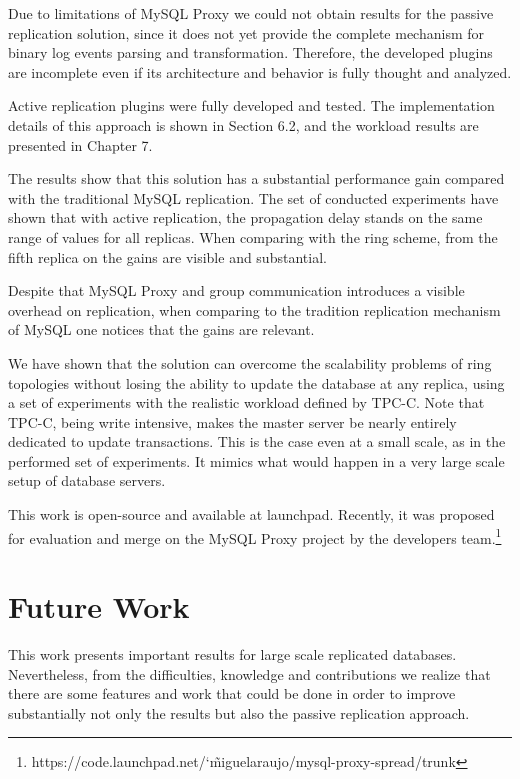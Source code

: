 Due to limitations of MySQL Proxy we could not obtain results for the passive replication solution, since it does not yet provide the complete mechanism for binary log events parsing and transformation. Therefore, the developed plugins are incomplete even if its architecture and behavior is fully thought and analyzed.

Active replication plugins were fully developed and tested. The implementation details of this approach is shown in Section 6.2, and the workload results are presented in Chapter 7.

The results show that this solution has a substantial performance gain compared with the traditional MySQL replication. The set of conducted experiments have shown that with active replication, the propagation delay stands on the same range of values for all replicas. When comparing with the ring scheme, from the fifth replica on the gains are visible and substantial.

Despite that MySQL Proxy and group communication introduces a visible overhead on replication, when comparing to the tradition replication mechanism of MySQL one notices that the gains are relevant.

We have shown that the solution can overcome the scalability problems of ring topologies without losing the ability to update the database at any replica, using a set of experiments with the realistic workload defined by TPC-C. Note that TPC-C, being write intensive, makes the master server be nearly entirely dedicated to update transactions. This is the case even at a small scale, as in the performed set of experiments. It mimics what would happen in a very large scale setup of database servers.

This work is open-source and available at launchpad. Recently, it was proposed for evaluation and merge on the MySQL Proxy project by the developers team.\footnote{https://code.launchpad.net/\char`\~miguelaraujo/mysql-proxy-spread/trunk}


\section{Future Work}

This work presents important results for large scale replicated databases. Nevertheless, from the difficulties, knowledge and contributions we realize that there are some features and work that could be done in order to improve substantially not only the results but also the passive replication approach. 

